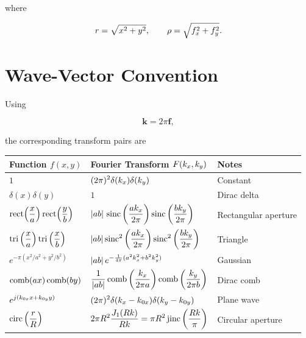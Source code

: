 where

\[
r=\sqrt{x^2+y^2},
\qquad
\rho=\sqrt{f_x^2+f_y^2}.
\]

\pagebreak
\section{Wave-Vector Convention}

Using

\[
\mathbf{k}=2\pi\mathbf{f},
\]

the corresponding transform pairs are

\begin{center}
\begin{tabular}{lll}
\toprule
Function $f(x,y)$ & Fourier Transform $F(k_x,k_y)$ & Notes\\
\midrule

$\displaystyle
1
$
&
$\displaystyle
(2\pi)^2\delta(k_x)\delta(k_y)
$
&
Constant

\\[0.5cm]

$\displaystyle
\delta(x)\delta(y)
$
&
$\displaystyle
1
$
&
Dirac delta

\\[0.5cm]

$\displaystyle
\operatorname{rect}\!\left(\frac{x}{a}\right)
\operatorname{rect}\!\left(\frac{y}{b}\right)
$
&
$\displaystyle
|ab|\,
\operatorname{sinc}\left(\frac{ak_x}{2\pi}\right)
\operatorname{sinc}\left(\frac{bk_y}{2\pi}\right)
$
&
Rectangular aperture

\\[0.5cm]

$\displaystyle
\operatorname{tri}\left(\frac{x}{a}\right)\operatorname{tri}\left(\frac{x}{b}\right)
$
&
$\displaystyle
|ab|\operatorname{sinc}^2\left(\frac{ak_x}{2\pi}\right)
\operatorname{sinc}^2\left(\frac{bk_y}{2\pi}\right)
$
&
Triangle

\\[0.5cm]

$\displaystyle
e^{-\pi(x^2/a^2+y^2/b^2)}
$
&
$\displaystyle
|ab|\,
e^{-\frac{1}{4\pi}(a^2k_x^2+b^2k_y^2)}
$
&
Gaussian
\\[0.5cm]

$\displaystyle
\operatorname{comb}(ax)\operatorname{comb}(by)
$
&
$\displaystyle
\frac{1}{|ab|}\operatorname{comb}\left(\frac{k_x}{2\pi a}\right)\operatorname{comb}\left(\frac{k_y}{2\pi b}\right)
$
&
Dirac comb

\\[0.5cm]
$\displaystyle
e^{j(k_{0x}x+k_{0y}y)}
$
&
$\displaystyle
(2\pi)^2
\delta(k_x-k_{0x})
\delta(k_y-k_{0y})
$
&
Plane wave

\\[0.5cm]

$\displaystyle
\operatorname{circ}\left(\frac{r}{R}\right)
$
&
$\displaystyle
2\pi R^2\frac{J_1(R k)}{R k}=\pi R^2\operatorname{jinc}\left(\frac{R k}{\pi}\right)
$
&
Circular aperture
\\

\bottomrule
\end{tabular}
\end{center}

